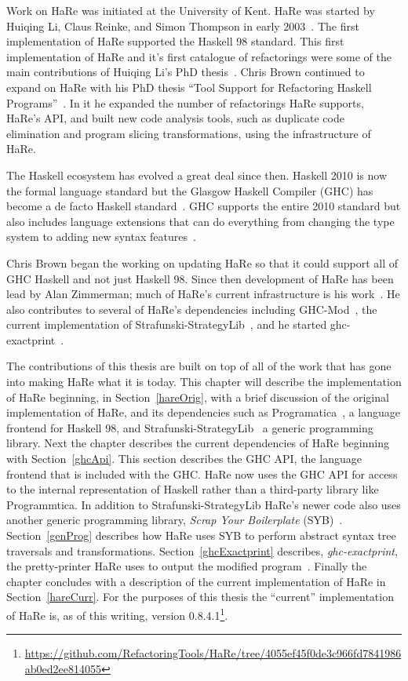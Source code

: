 Work on HaRe was initiated at the University of Kent. HaRe was started by Huiqing Li, Claus Reinke, and Simon Thompson in early 2003~\citep{refacWebsite}. The first implementation of HaRe supported the Haskell 98 standard. This first implementation of HaRe and it's first catalogue of refactorings were some of the main contributions of Huiqing Li's PhD thesis~\citep{huiqingThesis}.  Chris Brown continued to expand on HaRe with his PhD thesis ``Tool Support for Refactoring Haskell Programs''~\citep{brownThesis}. In it he expanded the number of refactorings HaRe supports, HaRe's API, and built new code analysis tools, such as duplicate code elimination and program slicing transformations, using the infrastructure of HaRe.

	The Haskell ecosystem has evolved a great deal since then. Haskell 2010 is now the formal language standard but the Glasgow Haskell Compiler (GHC) has become a de facto Haskell standard~\citep{refacTools}. GHC supports the entire 2010 standard but also includes language extensions that can do everything from changing the type system to adding new syntax features~\citep{langExts}. 
	
	Chris Brown began the working on updating HaRe so that it could support all of GHC Haskell and not just Haskell 98. Since then development of HaRe has been lead by Alan Zimmerman; much of HaRe's current infrastructure is his work~\citep{hareCurrent}. He also contributes to several of HaRe's dependencies including GHC-Mod~\citep{ghcMod}, the current implementation of Strafunski-StrategyLib~\citep{strafunskiGit}, and he started ghc-exactprint~\citep{exactprint}.
	
	The contributions of this thesis are built on top of all of the work that has gone into making HaRe what it is today. This chapter will describe the implementation of HaRe beginning, in Section~\ref{hareOrig}, with a brief discussion of the original implementation of HaRe, and its dependencies such as Programatica~\citep{programatica}, a language frontend for Haskell 98, and Strafunski-StrategyLib~\citep{strafunski} a generic programming library. Next the chapter describes the current dependencies of HaRe beginning with Section~\ref{ghcApi}. This section describes the GHC API, the language frontend that is included with the GHC. HaRe now uses the GHC API for access to the internal representation of Haskell rather than a third-party library like Programmtica. In addition to Strafunski-StrategyLib HaRe's newer code also uses another generic programming library, \textit{Scrap Your Boilerplate} (SYB)~\citep{syb}. Section~\ref{genProg} describes how HaRe uses SYB to perform abstract syntax tree traversals and transformations. Section~\ref{ghcExactprint} describes, \textit{ghc-exactprint}, the pretty-printer HaRe uses to output the modified program~\citep{exactprint}. Finally the chapter concludes with a description of the current implementation of HaRe in Section~\ref{hareCurr}. For the purposes of this thesis the ``current'' implementation of HaRe is, as of this writing, version 0.8.4.1\footnote{\url{https://github.com/RefactoringTools/HaRe/tree/4055ef45f0de3c966fd7841986ab0ed2ee814055}}.

